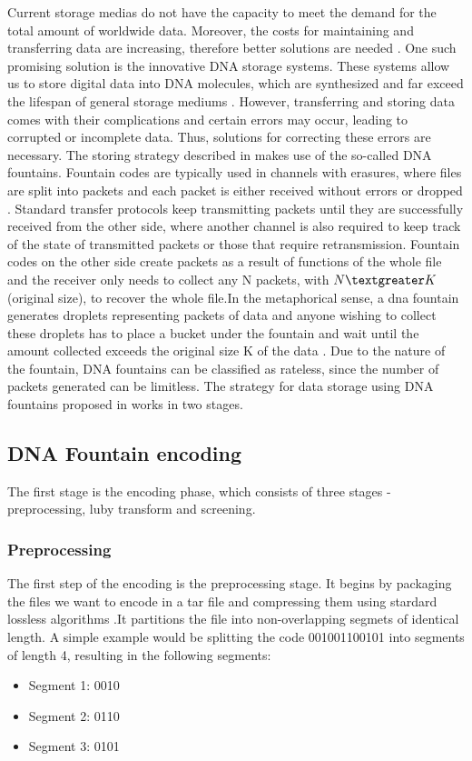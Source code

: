 \documentclass[12pt]%
{article}
\begin{document}
Current storage medias do not have the capacity to meet the demand for the total amount of worldwide data. Moreover, the costs for maintaining and transferring data are increasing, therefore better solutions are needed \cite{dong2020dna}. One such promising solution is the innovative DNA storage systems. These systems allow us to store digital data into DNA molecules, which are synthesized and far exceed the lifespan of general storage mediums \cite{dong2020dna}. However, transferring and storing data comes with their complications and certain errors may occur, leading to corrupted or incomplete data. Thus, solutions for correcting these errors are necessary. The storing strategy described in \cite{erlich2017dna} makes use of the so-called DNA fountains. Fountain codes are typically used in channels with erasures, where files are split into packets and each packet is either received without errors or dropped \cite{mackay2005fountain}.  Standard transfer protocols keep transmitting packets until they are successfully received from the other side, where another channel is also required to keep track of the state of transmitted packets or those that require retransmission. Fountain codes on the other side create packets as a result of functions of the whole file and the receiver only needs to collect any N packets, with $N \textgreater K$ (original size), to recover the whole file.In the metaphorical sense, a dna fountain generates droplets representing packets of data and anyone wishing to collect these droplets has to place a bucket under the fountain and wait until the amount collected exceeds the original size K of the data \cite{mackay2005fountain}. Due to the nature of the fountain,  DNA fountains can be classified as rateless, since the number of packets generated can be limitless.
The strategy for data storage using DNA fountains proposed in \cite{erlich2017dna} works in two stages.

\subsection{DNA Fountain encoding}

The first stage is the encoding phase, which consists of three stages - preprocessing, luby transform and screening.

\subsubsection{Preprocessing}  
The first step of the encoding is the preprocessing stage. It begins by packaging the files we want to encode in a tar file and compressing them using stardard lossless algorithms \cite{erlich2017dnasupplementary}.It partitions the file into non-overlapping segmets of identical length. A simple example would be splitting the code 001001100101 into segments of length 4, resulting in the following segments:
\begin{itemize}
\item Segment 1: 0010
\item Segment 2: 0110
\item Segment 3: 0101
\end{itemize}
\end{document}
